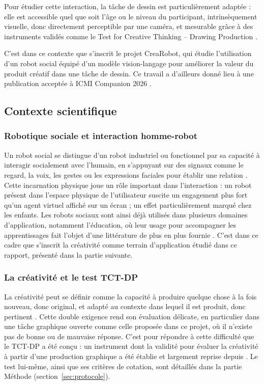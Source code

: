 \documentclass[11pt]{article}
\begin{document}
Pour étudier cette interaction, la tâche de dessin est particulièrement adaptée : elle est accessible quel que soit l'âge ou le niveau du participant, intrinsèquement visuelle, donc directement perceptible par une caméra, et mesurable grâce à des instruments validés comme le Test for Creative Thinking – Drawing Production \cite{urban2005}.

C'est dans ce contexte que s'inscrit le projet CreaRobot, qui étudie l'utilisation d'un robot social équipé d'un modèle vision-langage pour améliorer la valeur du produit créatif dans une tâche de dessin. Ce travail a d'ailleurs donné lieu à une publication acceptée à ICMI Companion 2026 \cite{cuveillier2026crearobot}.

\subsection{Contexte scientifique}

\subsubsection{Robotique sociale et interaction homme-robot}

Un robot social se distingue d'un robot industriel ou fonctionnel par sa capacité à interagir socialement avec l'humain, en s'appuyant sur des signaux comme le regard, la voix, les gestes ou les expressions faciales pour établir une relation \cite{breazeal2004}. Cette incarnation physique joue un rôle important dans l'interaction : un robot présent dans l'espace physique de l'utilisateur suscite un engagement plus fort qu'un agent virtuel affiché sur un écran ; un effet particulièrement marqué chez les enfants. Les robots sociaux sont ainsi déjà utilisés dans plusieurs domaines d'application, notamment l'éducation, où leur usage pour accompagner les apprentissages fait l'objet d'une littérature de plus en plus fournie \cite{belpaeme2018,johal2020}. C'est dans ce cadre que s'inscrit la créativité comme terrain d'application étudié dans ce rapport, présenté dans la partie suivante.

\subsubsection{La créativité et le test TCT-DP}

La créativité peut se définir comme la capacité à produire quelque chose à la fois nouveau, donc original, et adapté au contexte dans lequel il est produit, donc pertinent \cite{lubart2003}. Cette double exigence rend son évaluation délicate, en particulier dans une tâche graphique ouverte comme celle proposée dans ce projet, où il n'existe pas de bonne ou de mauvaise réponse. C'est pour répondre à cette difficulté que le TCT-DP a été conçu : un instrument dont la validité pour évaluer la créativité à partir d'une production graphique a été établie et largement reprise depuis \cite{urbanjellen1996,urban2005}. Le test lui-même, ainsi que ses critères de cotation, sont détaillés dans la partie Méthode (section~\ref{sec:protocole}).
\end{document}
